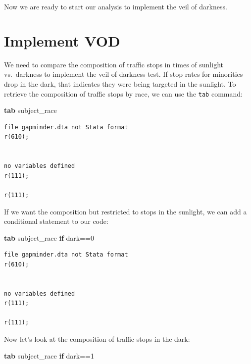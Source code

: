 \documentclass[
]{book}
\newenvironment{Shaded}{\begin{snugshade}}{\end{snugshade}}
\newcommand{\KeywordTok}[1]{\textcolor[rgb]{0.13,0.29,0.53}{\textbf{#1}}}
\newcommand{\NormalTok}[1]{#1}
\begin{document}
Now we are ready to start our analysis to implement the veil of darkness.

\section{Implement VOD}\label{implement-vod}

We need to compare the composition of traffic stops in times of sunlight vs.~darkness to implement the veil of darkness test. If stop rates for minorities drop in the dark, that indicates they were being targeted in the sunlight. To retrieve the composition of traffic stops by race, we can use the \texttt{tab} command:

\begin{Shaded}
\begin{Highlighting}[]
\KeywordTok{tab}\NormalTok{ subject\_race }
\end{Highlighting}
\end{Shaded}

\begin{verbatim}
file gapminder.dta not Stata format
r(610);


no variables defined
r(111);

r(111);
\end{verbatim}

If we want the composition but restricted to stops in the sunlight, we can add a conditional statement to our code:

\begin{Shaded}
\begin{Highlighting}[]
\KeywordTok{tab}\NormalTok{ subject\_race }\KeywordTok{if}\NormalTok{ dark==0 }
\end{Highlighting}
\end{Shaded}

\begin{verbatim}
file gapminder.dta not Stata format
r(610);


no variables defined
r(111);

r(111);
\end{verbatim}

Now let's look at the composition of traffic stops in the dark:

\begin{Shaded}
\begin{Highlighting}[]
\KeywordTok{tab}\NormalTok{ subject\_race }\KeywordTok{if}\NormalTok{ dark==1 }
\end{Highlighting}
\end{Shaded}
\end{document}
